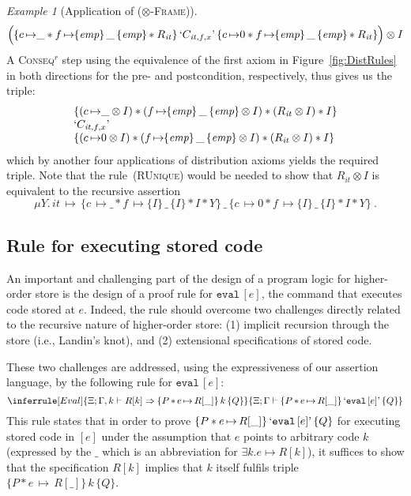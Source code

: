 \documentclass{LMCS}
\theoremstyle{remark}
\newtheorem{example}[theorem]{Example}
\newcommand{\QUOTE}[1]{\textnormal{`\ensuremath{#1}'}}
\newcommand{\UNQUOTE}[1]{\SYN{eval}\,{#1}}
\newcommand{\SYN}[1]{\ensuremath{\texttt{#1}}}
\newcommand{\triple}[3]{{\ensuremath{\!\left.\{ #1 \}\, #2\, \{  #3 \}\!\right.}}}
\newcommand{\pointsto}{\ensuremath{\mapsto}}
\newcommand{\EMP}{\ensuremath{\textit{emp}}}
\newcommand{\X}{\ensuremath{\Xi}}
\begin{document}
\begin{example}[Application of (\textsc{$\otimes$-Frame})]
$$
\Bigl(
\triple{c\, {\pointsto}\_ * f\,{\pointsto}\triple{\EMP}{\_}{\EMP} * R_{\mathit{it}}}
{\QUOTE{C_{\mathit{it},f,x}}}
{c\,{\pointsto}0 * f\,{\pointsto}\triple{\EMP}{\_}{\EMP} * R_{\mathit{it}}}\Bigr) \otimes I
$$
A \textsc{Conseq}$^r$ step  using the equivalence of the first axiom in  Figure~\ref{fig:DistRules}  in both directions for the pre- and postcondition, respectively,  thus gives us the triple:
\[\begin{array}{l}
\{(c\, {\pointsto}\_\otimes I) * (f\,{\pointsto}\triple{\EMP}{\_}{\EMP}  \otimes I) * (R_{\mathit{it}} \otimes I) * I \}\\
{\QUOTE{C_{\mathit{it},f,x}}}\\
\{(c\,{\pointsto}0 \otimes I) * (f\,{\pointsto}\triple{\EMP}{\_}{\EMP} \otimes  I)* (R_{\mathit{it}} \otimes  I) *  I\}  
\end{array}
\]
which by another four applications of distribution axioms yields the required triple.
Note that the rule~\textsc{(RUnique)}   would be needed to show   that $R_{\mathit{it}} \otimes  I$ is equivalent to the recursive assertion
$$
\mu Y.\,  \mathit{it} \, {\pointsto}\,
 \triple{c\,{\pointsto}\_ *  f\,{\pointsto}\triple{I}{\_}{I} * I *Y}
 {\_}
{c\,{\pointsto}0 * f\,{\pointsto}\triple{I}{\_}{I} *I* Y}\ .
$$
\end{example}




\subsection{Rule for executing stored code}
\label{subsec:eval-rule}
An important and challenging 
part of the design of a program logic for higher-order store is the
design of a proof rule for $\UNQUOTE{[e]}$, the command
that executes code stored at $e$.
Indeed, the rule should overcome two challenges directly
related to the recursive nature of higher-order store: (1)
implicit recursion through the store (i.e., Landin's knot), and (2)
extensional specifications of stored code.

These two challenges are addressed, using the expressiveness of our
assertion language, by the following rule for $\UNQUOTE{[e]}$:
$$
\inferrule[Eval]{
  \X;\Gamma,k \adash R[k] \Rightarrow \triple{P\,{*}\,e\,{\pointsto}\,R[\_]}{k}{Q}
}{
  \X;\Gamma \adash \triple{P\,{*}\,e\,{\pointsto}\,R[\_]}{\QUOTE{\UNQUOTE{[e]}}}{Q}
}
$$
This rule states that in order to prove $\triple{P*e\,{\pointsto}\,R[\_]}{\QUOTE{\UNQUOTE{[e]}}}{Q}$ for executing stored code in $[e]$ under the assumption that $e$ points to arbitrary code $k$ (expressed by the $\_$ which is an abbreviation for $\exists k. e\mapsto R[k]$), it suffices to show that the specification $R[k]$ implies  that $k$ itself fulfils triple 
$\triple{P*e\,{\pointsto}\,R[\_]}{k}{Q}$. 
\end{document}
